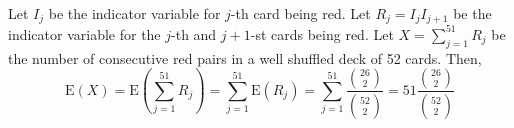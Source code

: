 Let $I_{j}$ be the indicator variable for $j$-th card being red. Let $R_{j} =
I_{j}I_{j+1}$ be the indicator variable for the $j$-th and $j+1$-st cards being
red. Let $X = \sum_{j=1}^{51}R_{j}$ be the number of consecutive red pairs in a
well shuffled deck of 52 cards. Then, $$\text{E}(X) = \text{E}(\sum_{j=1}^{51}R_
{j}) = \sum_{j=1}^{51}\text{E}(R_{j}) = \sum_{j=1}^{51}\frac{\binom{26}{2}}{
\binom{52}{2}} = 51\frac{\binom{26}{2}}{\binom{52}{2}}$$